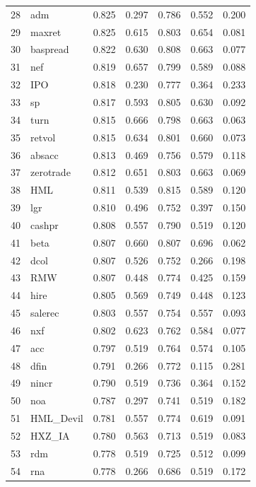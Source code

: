 \begin{footnotesize}
\begin{longtable}{rl|c|c|c|c|c}
  28 & adm & 0.825 & 0.297 & 0.786 & 0.552 & 0.200 \\ 
  29 & maxret & 0.825 & 0.615 & 0.803 & 0.654 & 0.081 \\ 
  30 & baspread & 0.822 & 0.630 & 0.808 & 0.663 & 0.077 \\ 
  31 & nef & 0.819 & 0.657 & 0.799 & 0.589 & 0.088 \\ 
  32 & IPO & 0.818 & 0.230 & 0.777 & 0.364 & 0.233 \\ 
  33 & sp & 0.817 & 0.593 & 0.805 & 0.630 & 0.092 \\ 
  34 & turn & 0.815 & 0.666 & 0.798 & 0.663 & 0.063 \\ 
  35 & retvol & 0.815 & 0.634 & 0.801 & 0.660 & 0.073 \\ 
  36 & absacc & 0.813 & 0.469 & 0.756 & 0.579 & 0.118 \\ 
  37 & zerotrade & 0.812 & 0.651 & 0.803 & 0.663 & 0.069 \\ 
  38 & HML & 0.811 & 0.539 & 0.815 & 0.589 & 0.120 \\ 
  39 & lgr & 0.810 & 0.496 & 0.752 & 0.397 & 0.150 \\ 
  40 & cashpr & 0.808 & 0.557 & 0.790 & 0.519 & 0.120 \\ 
  41 & beta & 0.807 & 0.660 & 0.807 & 0.696 & 0.062 \\ 
  42 & dcol & 0.807 & 0.526 & 0.752 & 0.266 & 0.198 \\ 
  43 & RMW & 0.807 & 0.448 & 0.774 & 0.425 & 0.159 \\ 
  44 & hire & 0.805 & 0.569 & 0.749 & 0.448 & 0.123 \\ 
  45 & salerec & 0.803 & 0.557 & 0.754 & 0.557 & 0.093 \\ 
  46 & nxf & 0.802 & 0.623 & 0.762 & 0.584 & 0.077 \\ 
  47 & acc & 0.797 & 0.519 & 0.764 & 0.574 & 0.105 \\ 
  48 & dfin & 0.791 & 0.266 & 0.772 & 0.115 & 0.281 \\ 
  49 & nincr & 0.790 & 0.519 & 0.736 & 0.364 & 0.152 \\ 
  50 & noa & 0.787 & 0.297 & 0.741 & 0.519 & 0.182 \\ 
  51 & HML\_Devil & 0.781 & 0.557 & 0.774 & 0.619 & 0.091 \\ 
  52 & HXZ\_IA & 0.780 & 0.563 & 0.713 & 0.519 & 0.083 \\ 
  53 & rdm & 0.778 & 0.519 & 0.725 & 0.512 & 0.099 \\ 
  54 & rna & 0.778 & 0.266 & 0.686 & 0.519 & 0.172 \\ 

\end{longtable}
\end{footnotesize}
